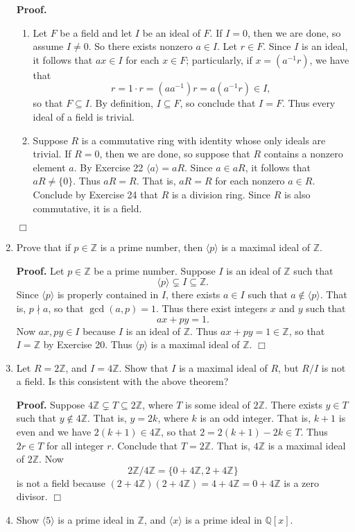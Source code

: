 \documentclass[9pt]{article}
\newcommand{\qed}{\hfill \ensuremath{\Box}}
\newcommand{\cyc}[1]{\langle #1 \rangle}
\newcommand{\Z}{\mathbb{Z}}
\newcommand{\Q}{\mathbb{Q}}
\begin{document}
\begin{enumerate}
      \textbf{Proof.}
      
      \begin{enumerate}
         \item Let $F$ be a field and let $I$ be an ideal of $F$. If $I = 0$,
               then we are done, so assume $I \neq 0$. So there exists nonzero
               $a \in I$. Let $r \in F$. Since $I$ is an ideal, it follows that
               $ax \in I$ for each $x \in F$; particularly, if $x = (a^{-1}r)$,
               we have that
               $$r = 1 \cdot r = (aa^{-1})r = a(a^{-1}r) \in I,$$
               so that $F \subseteq I$. By definition, $I \subseteq F$, so
               conclude that $I = F$. Thus every ideal of a field is trivial.
         \item Suppose $R$ is a commutative ring with identity whose only ideals
               are trivial. If $R = 0$, then we are done, so suppose that $R$
               contains a nonzero element $a$. By Exercise 22 $\cyc{a} = aR$.
               Since $a \in aR$, it follows that $aR \neq \{0\}$. Thus $aR = R$.
               That is, $aR = R$ for each nonzero $a \in R$. Conclude by
               Exercise 24 that $R$ is a division ring. Since $R$ is also
               commutative, it is a field.
      \end{enumerate} \qed
   \item Prove that if $p \in \Z$ is a prime number, then $\cyc{p}$ is a maximal
         ideal of $\Z$.
         
      \textbf{Proof.} Let $p \in \Z$ be a prime number. Suppose $I$ is an ideal
      of $\Z$ such that
      $$\cyc{p} \subsetneq I \subseteq \Z.$$
      Since $\cyc{p}$ is properly contained in $I$, there exists $a \in I$ such
      that $a \notin \cyc{p}$. That is, $p \nmid a$, so that $\gcd(a, p) = 1$.
      Thus there exist integers $x$ and $y$ such that
      $$ax + py = 1.$$
      Now $ax, py \in I$ because $I$ is an ideal of $\Z$. Thus
      $ax + py = 1 \in \Z$, so that $I = \Z$ by Exercise 20. Thus $\cyc{p}$ is a
      maximal ideal of $\Z$. \qed
   \item Let $R = 2\Z$, and $I = 4\Z$. Show that $I$ is a maximal ideal of $R$,
         but $R/I$ is not a field. Is this consistent with the above theorem?
         
      \textbf{Proof.} Suppose $4\Z \subsetneq T \subseteq 2\Z$, where $T$ is some
      ideal of $2\Z$. There exists $y \in T$ such that $y \notin 4\Z$. That is,
      $y = 2k$, where $k$ is an odd integer. That is, $k + 1$ is even and we
      have $2(k + 1) \in 4\Z$, so that $2 = 2(k + 1) - 2k \in T$. Thus
      $2r \in T$ for all integer $r$. Conclude that $T = 2\Z$. That is, $4\Z$ is
      a maximal ideal of $2\Z$. Now
      $$2\Z/4\Z = \{0 + 4\Z, 2 + 4\Z\}$$
      is not a field because $(2 + 4\Z)(2 + 4\Z) = 4 + 4\Z = 0 + 4\Z$ is a zero
      divisor. \qed
   \item Show $\cyc{5}$ is a prime ideal in $\Z$, and $\cyc{x}$ is a prime ideal
         in $\Q[x]$.
         

\end{enumerate}
\end{document}
